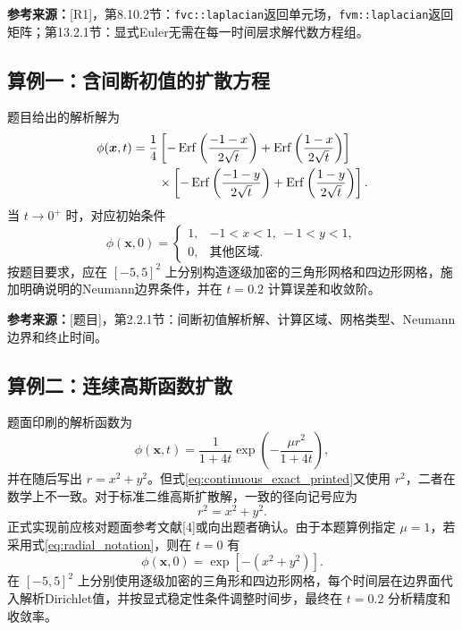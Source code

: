 \documentclass[UTF8,12pt,a4paper]{ctexart}
\numberwithin{equation}{section}
\newcommand{\Rone}{\textnormal{[R1]}}
\newcommand{\Task}{\textnormal{[题目]}}
\newcommand{\source}[1]{%
  \par\smallskip
  \noindent\colorbox{sourcebg}{%
    \parbox{0.955\linewidth}{\raggedright\footnotesize\color{sourcegray}\textbf{参考来源：}#1}%
  }
  \par\smallskip
}
\newcommand{\xf}{\bm x}
\begin{document}
\source{\Rone，第8.10.2节：\texttt{fvc::laplacian}返回单元场，\texttt{fvm::laplacian}返回矩阵；第13.2.1节：显式Euler无需在每一时间层求解代数方程组。}

\subsection{算例一：含间断初值的扩散方程}

题目给出的解析解为
\begin{align}
  \phi(\xf,t)
  =\frac14
  &\left[
  -\operatorname{Erf}\left(\frac{-1-x}{2\sqrt t}\right)
  +\operatorname{Erf}\left(\frac{1-x}{2\sqrt t}\right)
  \right]
  \notag\\
  &\times
  \left[
  -\operatorname{Erf}\left(\frac{-1-y}{2\sqrt t}\right)
  +\operatorname{Erf}\left(\frac{1-y}{2\sqrt t}\right)
  \right].
  \label{eq:discontinuous_exact}
\end{align}
当 $t\to0^+$ 时，对应初始条件
\begin{equation}
  \phi(\xf,0)=
  \begin{cases}
    1, & -1<x<1,\ -1<y<1,\\
    0, & \text{其他区域}.
  \end{cases}
  \label{eq:discontinuous_initial}
\end{equation}
按题目要求，应在 $[-5,5]^2$ 上分别构造逐级加密的三角形网格和四边形网格，施加明确说明的Neumann边界条件，并在 $t=0.2$ 计算误差和收敛阶。

\source{\Task，第2.2.1节：间断初值解析解、计算区域、网格类型、Neumann边界和终止时间。}

\subsection{算例二：连续高斯函数扩散}

题面印刷的解析函数为
\begin{equation}
  \phi(\xf,t)
  =\frac{1}{1+4t}
   \exp\left(-\frac{\mu r^2}{1+4t}\right),
  \label{eq:continuous_exact_printed}
\end{equation}
并在随后写出 $r=x^2+y^2$。但式\eqref{eq:continuous_exact_printed}又使用 $r^2$，二者在数学上不一致。对于标准二维高斯扩散解，一致的径向记号应为
\begin{equation}
  r^2=x^2+y^2.
  \label{eq:radial_notation}
\end{equation}
正式实现前应核对题面参考文献[4]或向出题者确认。由于本题算例指定 $\mu=1$，若采用式\eqref{eq:radial_notation}，则在 $t=0$ 有
\begin{equation}
  \phi(\xf,0)=\exp[-(x^2+y^2)].
  \label{eq:continuous_initial}
\end{equation}
在 $[-5,5]^2$ 上分别使用逐级加密的三角形和四边形网格，每个时间层在边界面代入解析Dirichlet值，并按显式稳定性条件调整时间步，最终在 $t=0.2$ 分析精度和收敛率。
\end{document}
